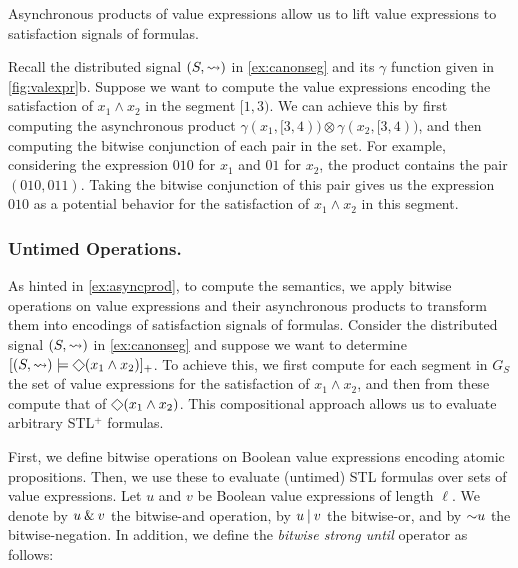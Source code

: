 Asynchronous products of value expressions allow us to lift value expressions to satisfaction signals of formulas.

\begin{example} \label{ex:asyncprod}
	Recall the distributed signal $(S, {\rightsquigarrow})$ in \cref{ex:canonseg} and its $\gamma$ function given in \cref{fig:valexpr}b.
	Suppose we want to compute the value expressions encoding the satisfaction of $x_1 \land x_2$ in the segment $[1,3)$.
	We can achieve this by first computing the asynchronous product $\gamma(x_1, [3,4)) \otimes \gamma(x_2, [3,4))$, and then computing the bitwise conjunction of each pair in the set.
	For example, considering the expression $010$ for $x_1$ and $01$ for $x_2$, the product contains the pair $(010, 011)$.
	Taking the bitwise conjunction of this pair gives us the expression $010$ as a potential behavior for the satisfaction of $x_1 \land x_2$ in this segment.
\end{example}

\subsubsection{Untimed Operations.}
As hinted in \cref{ex:asyncprod}, to compute the semantics, we apply bitwise operations on value expressions and their asynchronous products to transform them into encodings of satisfaction signals of formulas.
Consider the distributed signal $(S, {\rightsquigarrow})$ in \cref{ex:canonseg} and suppose we want to determine 
$[(S, {\hb}) \models \LTLeventually (x_1 \land x_2)]_+$.
To achieve this, we first compute for each segment in $G_S$ the set of value expressions for the satisfaction of $x_1 \land x_2$, and then from these compute that of $\LTLeventually (x_1 \land x_2)$.
This compositional approach allows us to evaluate arbitrary STL$^+$ formulas.

First, we define bitwise operations on Boolean value expressions encoding atomic propositions.
Then, we use these to evaluate (untimed) STL formulas over sets of value expressions.
%
Let $u$ and $v$ be Boolean value expressions of length $\ell$.
We denote by $u \mathbin{\&} v$ the bitwise-and operation, by $u \mathbin{|} v$ the bitwise-or, and by $\mathord{\sim} u$ the bitwise-negation.
In addition, we define the \emph{bitwise strong until} operator as follows:

